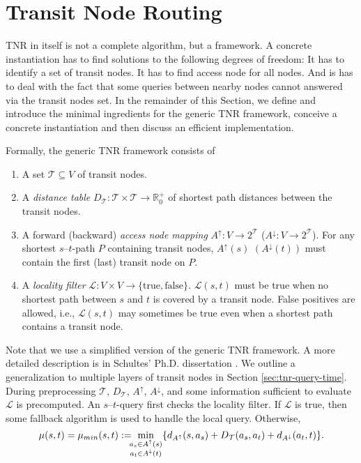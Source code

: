 \documentclass{llncs}
\begin{document}
\section{Transit Node Routing}
\label{sec:tnr-tnr}

TNR in itself is not a complete algorithm, but a framework.
A concrete instantiation has to find solutions to the following degrees of freedom:
It has to identify a set of transit nodes.
It has to find access node for all nodes.
And is has to deal with the fact that some queries between nearby nodes cannot answered via the transit nodes set.
In the remainder of this Section, we define and introduce the minimal ingredients for the generic TNR framework, conceive a concrete instantiation and then discuss an efficient implementation.

\begin{definition}
\label{tnr:dfn-tnr}
Formally, the generic TNR framework consists of
\begin{enumerate}
\item A set $\mathcal{T} \subseteq V $ of transit nodes.
\item A \textit{distance table} 
  $D_\mathcal{T}: \mathcal{T} \times \mathcal{T} \to \mathbb{R} _0^+$
  of shortest path distances between the transit nodes.
\item A forward (backward) \textit{access node mapping} $A^\uparrow : V   \rightarrow 2^\mathcal{T}$ ($A^\downarrow: V \rightarrow 2^\mathcal{T}$).  For any shortest $s$--$t$-path $P$ containing transit nodes, $A^\uparrow(s)$ $\left(A^\downarrow(t)\right)$ must contain the first (last) transit node on $P$.
\item A \textit{locality filter} 
  $\mathcal{L}:V\times V\rightarrow\{\text{true},   \text{false}\}$.   
  $\mathcal{L}(s,t)$ must be true when no shortest path   
  between $s$ and $t$ is covered by a transit node. 
  False positives are allowed, i.e., $\mathcal{L}(s,t)$ may sometimes 
  be true even when a shortest path
  contains a transit node.
\end{enumerate}
\end{definition}
Note that we use a simplified version of the generic TNR framework. 
A more detailed description is in Schultes' Ph.D. dissertation \cite{s-rprn-08}.
We outline a generalization to multiple layers of transit nodes in Section \ref{sec:tnr-query-time}.
During preprocessing $\mathcal{T}$, $D_\mathcal{T}$, $A^\uparrow$, $A^\downarrow$, and some information sufficient to evaluate $\mathcal{L}$ is precomputed. An $s$--$t$-query first checks the locality filter. If  $\mathcal{L}$ is true, then some fallback algorithm is used to handle the local query. Otherwise, 
\begin{equation}\label{eq:distance}
\mu(s,t)=\mu_{min}(s,t) :=  \mspace{-9mu}\min_{\substack{a_s\in A^\uparrow(s)\\a_t\in A^\downarrow(t)}} \{d_{A^\uparrow}(s,a_s)+D_\mathcal{T}(a_s,a_t)+d_{A^\downarrow}(a_t,t)\}.
\end{equation}
\end{document}
